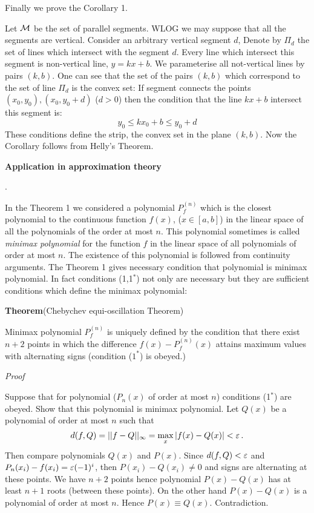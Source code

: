 {\smallskip



Finally we prove the Corollary 1.

Let $\cal M$ be  the set of parallel segments. WLOG we may suppose that
all the segments are vertical. 
Consider an arbitrary vertical segment $d$,
 Denote by $\Pi_d$ the set of lines which
intersect with the segment $d$. Every line which intersect
this segment is non-vertical line, $y=kx+b$.
We parameterise all not-vertical lines by pairs
$(k,b)$. One can see that the set of the pairs 
$(k,b)$ which correspond to the set of line $\Pi_d$ is the convex set:
If segment connects the points $(x_0,y_0), (x_0,y_0+d)$ ($d>0$) then  
the condition that the line $kx+b$ intersect this segment is:
           $$
   y_0\leq  kx_0+b\leq y_0+d 
             $$
These conditions define the strip, the convex set in the plane $(k,b)$.
Now the Corollary follows from Helly's Theorem.\finish

\m
\centerline {\bf Application in approximation theory}.

    In the Theorem 1 we considered a
 polynomial $P^{(n)}_f$ which is the closest polynomial to the
continuous function $f(x)$, ($x\in [a,b]$) in the linear space
of all the polynomials of the order at most $n$. 
This polynomial sometimes is called {\it minimax polynomial}
for the function $f$ in the linear space of all polynomials
of order at most $n$. The existence of this polynomial is followed
from continuity arguments. 
  The Theorem 1 gives necessary condition that 
polynomial is minimax polynomial.
In fact conditions (1,1$^*$) not only are necessary but they are
sufficient conditions which define the minimax polynomial:


{\bf Theorem}(Chebychev equi-oscillation Theorem) 
 
Minimax polynomial $P^{(n)}_f$ is uniquely defined
by the condition that there exist $n+2$ points
in which the difference $f(x)-P_f^{(n)}(x)$
attains maximum values with alternating signs
(condition ($1^*$) is obeyed.)

{\sl Proof} 

Suppose that for polynomial
($P_n(x)$ of order at most $n$) conditions (1$^*$)  are obeyed.
Show that this polynomial is minimax polynomial.  
Let $Q(x)$ be a polynomial of order at most $n$ such that 
             $$
      d(f,Q)=||f-Q||_\infty=\max_{x}|f(x)-Q(x)|<{\varepsilon}\,.
             $$
Then  compare polynomials $Q(x)$ and $P(x)$. Since $d(f,Q)<{\varepsilon}$
and $P_n(x_i)-f(x_i)={\varepsilon}(-1)^i$, then 
           $P(x_i)-Q(x_i)\not=0$ and signs are alternating
at these points. We have $n+2$ points hence polynomial
$P(x)-Q(x)$ has at least $n+1$ roots (between these points).
On the other hand $P(x)-Q(x)$ is a polynomial of order at most
$n$. Hence $P(x)\equiv Q(x)$. Contradiction.

}
